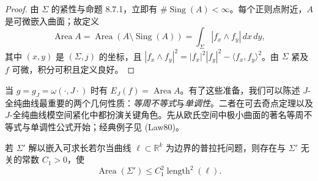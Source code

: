 \begin{proof}
由 $\Sigma$ 的紧性与命题 8.7.1，立即有
$\#\operatorname{Sing}(A)<\infty$。每个正则点附近，$A$ 是可微嵌入曲面；故定义
\[
 \operatorname{Area}A=\operatorname{Area}(A\setminus\operatorname{Sing}(A))
 =\int_\Sigma|f_x\wedge f_y|\,dx\,dy,
\]
其中 $(x,y)$ 是 $(\Sigma,j)$ 的坐标，且
$|f_x\wedge f_y|^2=|f_x|^2|f_y|^2-\langle f_x,f_y\rangle^2$。由
$\Sigma$ 紧及 $f$ 可微，积分可积且定义良好。
\end{proof}
当 $g=g_J=\omega(\cdot,J\cdot)$ 时有 $E_J(f)=\operatorname{Area}A$。有了这些准备，我们可以陈述 $J$-全纯曲线最重要的两个几何性质：\emph{等周不等式}与\emph{单调性}。二者在可去奇点定理以及 $J$-全纯曲线模空间紧化中都扮演关键角色。先从欧氏空间中极小曲面的著名等周不等式与单调性公式开始；经典例子见 (Law80)。
\begin{lemma}[经典等周不等式]\label{lem:ch8-classical-isoperimetric}
若 $\Sigma'$ 解以嵌入可求长若尔当曲线 $\ell\subset\mathbb R^k$ 为边界的普拉托问题，则存在与 $\Sigma'$ 无关的常数 $C_1>0$，使
\begin{equation}\operatorname{Area}(\Sigma')\leq C_1^2\operatorname{length}^2(\ell).\label{eq:ch8-classical-isoperimetric}\end{equation}
\end{lemma}

